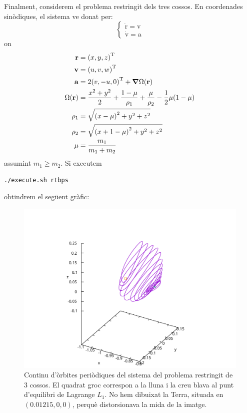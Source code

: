 \documentclass[10pt,a4paper]{article}
\newcommand{\vf}[1]{\boldsymbol{\mathrm{#1}}} %
\theoremstyle{definition}
\theoremstyle{remark}
\begin{document}
Finalment, considerem el problema restringit dels tres cossos. En coordenades sinòdiques, el sistema ve donat per:
$$
  \begin{cases}
    \vf{\dot{r}} = \vf{v} \\
    \vf{\dot{v}} = \vf{a}
  \end{cases}
$$
on
\begin{align*}
  \vf{r}         & ={(x,y,z)}^\mathrm{T}                                                              \\
  \vf{v}         & ={(u,v,w)}^\mathrm{T}                                                              \\
  \vf{a}         & =2{(v,-u,0)}^\mathrm{T}+\grad\Omega(\vf{r})                                        \\
  \Omega(\vf{r}) & =\frac{x^2+y^2}{2} + \frac{1-\mu}{\rho_1}+\frac{\mu}{\rho_2}-\frac{1}{2}\mu(1-\mu) \\
  \rho_1         & =\sqrt{{(x-\mu)}^2+y^2+z^2}                                                        \\
  \rho_2         & =\sqrt{{(x+1-\mu)}^2+y^2+z^2}                                                      \\
  \mu            & =\frac{m_1}{m_1+m_2}
\end{align*}
assumint $m_1\geq m_2$. Si executem
\begin{lstlisting}[language=Bash]
./execute.sh rtbps
\end{lstlisting}
obtindrem el següent gràfic:
\begin{figure}[ht]
  \centering\vspace{-2cm}
  \includegraphics[width=0.7\linewidth]{Images/rtbps.pdf}
  \caption{Continu d'òrbites periòdiques del sistema del problema restringit de 3 cossos. El quadrat groc correspon a la lluna i la creu blava al punt d'equilibri de Lagrange $L_1$. No hem dibuixat la Terra, situada en $(0.01215, 0, 0)$, perquè distorsionava la mida de la imatge.}
\end{figure}
\end{document}
